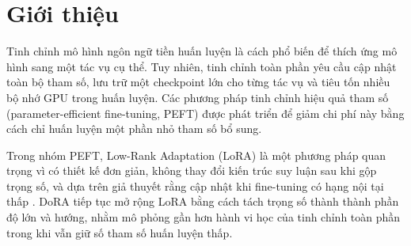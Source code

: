 \documentclass{article}
\theoremstyle{plain}
\theoremstyle{definition}
\begin{document}
\printAffiliationsAndNotice{}

\begin{abstract}
Báo cáo này trình bày quá trình cài đặt lại và tái hiện một phần phương pháp Weight-Decomposed Low-Rank Adaptation (DoRA) của Liu và cộng sự. Thay vì tái hiện toàn bộ hệ thí nghiệm gốc trên LLaMA, LLaVA và VL-BART, chúng tôi tập trung vào thuật toán lõi: đóng băng mô hình tiền huấn luyện, thay thế các lớp tuyến tính mục tiêu bằng các mô-đun LoRA hoặc DoRA tự cài đặt bằng PyTorch, sau đó đánh giá trên mô hình \texttt{vinai/phobert-base-v2}. Thực nghiệm chính được chạy trên tập UIT-VSFC với ba seed 42, 43 và 44, so sánh tinh chỉnh toàn phần, LoRA và DoRA ở hạng 8 và 16. Kết quả cho thấy các phương pháp PEFT đạt độ chính xác xấp xỉ tinh chỉnh toàn phần: full fine-tuning đạt accuracy trung bình 0.9478, LoRA r16 đạt 0.9480 và DoRA r16 đạt 0.9478. Trong khi đó, LoRA/DoRA chỉ huấn luyện dưới 1\% số tham số và tạo checkpoint khoảng 3.4--4.6 MB, nhỏ hơn rất nhiều so với checkpoint full fine-tuning khoảng 5.1 GB. Báo cáo cũng chỉ ra các khác biệt quan trọng so với bài báo gốc, các quyết định cài đặt, và những hạn chế khiến kết quả không thể được hiểu là tái hiện đầy đủ toàn bộ công bố DoRA.
\end{abstract}

\section{Giới thiệu}

Tinh chỉnh mô hình ngôn ngữ tiền huấn luyện là cách phổ biến để thích ứng mô hình sang một tác vụ cụ thể. Tuy nhiên, tinh chỉnh toàn phần yêu cầu cập nhật toàn bộ tham số, lưu trữ một checkpoint lớn cho từng tác vụ và tiêu tốn nhiều bộ nhớ GPU trong huấn luyện. Các phương pháp tinh chỉnh hiệu quả tham số (parameter-efficient fine-tuning, PEFT) được phát triển để giảm chi phí này bằng cách chỉ huấn luyện một phần nhỏ tham số bổ sung.

Trong nhóm PEFT, Low-Rank Adaptation (LoRA) \cite{hu2022lora} là một phương pháp quan trọng vì có thiết kế đơn giản, không thay đổi kiến trúc suy luận sau khi gộp trọng số, và dựa trên giả thuyết rằng cập nhật khi fine-tuning có hạng nội tại thấp \cite{aghajanyan2021intrinsic}. DoRA \cite{liu2024dora} tiếp tục mở rộng LoRA bằng cách tách trọng số thành thành phần độ lớn và hướng, nhằm mô phỏng gần hơn hành vi học của tinh chỉnh toàn phần trong khi vẫn giữ số tham số huấn luyện thấp.
\end{document}
